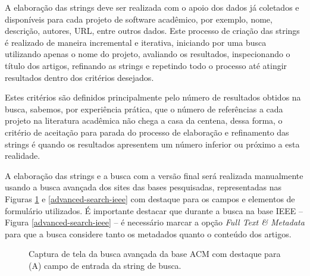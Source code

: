 A elaboração das strings deve ser realizada com o apoio dos dados já coletados
e disponíveis para cada projeto de software acadêmico, por exemplo, nome,
descrição, autores, URL, entre outros dados. Este processo de criação das
strings é realizado de maneira incremental e iterativa, iniciando por uma busca
utilizando apenas o nome do projeto, avaliando os resultados, inspecionando o
título dos artigos, refinando as strings e repetindo todo o processo até
atingir resultados dentro dos critérios desejados.

Estes critérios são definidos principalmente pelo
número de resultados obtidos na busca,
sabemos, por experiência prática, que o número de referências a cada projeto na
literatura acadêmica não chega a casa da centena, dessa forma, o critério de
aceitação para parada do processo de elaboração e refinamento das strings é
quando os resultados apresentem um número inferior ou próximo a esta realidade.

A elaboração das strings e a busca com a versão final será
realizada manualmente usando a busca avançada dos sites das bases pesquisadas,
representadas nas Figuras \ref{advanced-search-acm} e
\ref{advanced-search-ieee} com destaque para os campos e elementos de formulário
utilizados. É importante destacar que durante a busca na
base IEEE -- Figura \ref{advanced-search-ieee} -- é necessário marcar a opção {\it Full Text \& Metadata} para que a
busca considere tanto os metadados quanto o conteúdo dos artigos.

\begin{figure}[h]
  \center
  \caption{Captura de tela da busca avançada da base ACM com destaque para (A) campo de entrada da string de busca.}
  \label{advanced-search-acm}
\end{figure}

